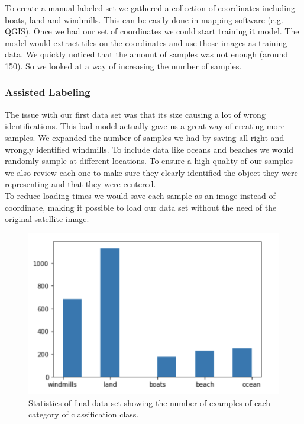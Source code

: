 To create a manual labeled set we gathered a collection of coordinates including boats, land and windmills. This can be easily done in mapping software (e.g. QGIS). Once we had our set of coordinates we could start training it model. The model would extract tiles on the coordinates and use those images as training data. We quickly noticed that the amount of samples was not enough (around 150). So we looked at a way of increasing the number of samples.

\subsubsection{Assisted Labeling}

The issue with our first data set was that its size causing a lot of wrong identifications. This bad model actually gave us a great way of creating more samples. We expanded the number of samples we had by saving all right and wrongly identified windmills. To include data like oceans and beaches we would randomly sample at different locations. To ensure a high quality of our samples we also review each one to make sure they clearly identified the object they were representing and that they were centered. \\

To reduce loading times we would save each sample as an image instead of coordinate, making it possible to load our data set without the need of the original satellite image. \\

\begin{figure}[ht]
\begin{center}
\centerline{\includegraphics[width=\columnwidth]{images/dataset-stats.png}}
\caption{Statistics of final data set showing the number of examples of each category of classification class.}
\label{dataset-statistics}
\end{center}
\end{figure}

